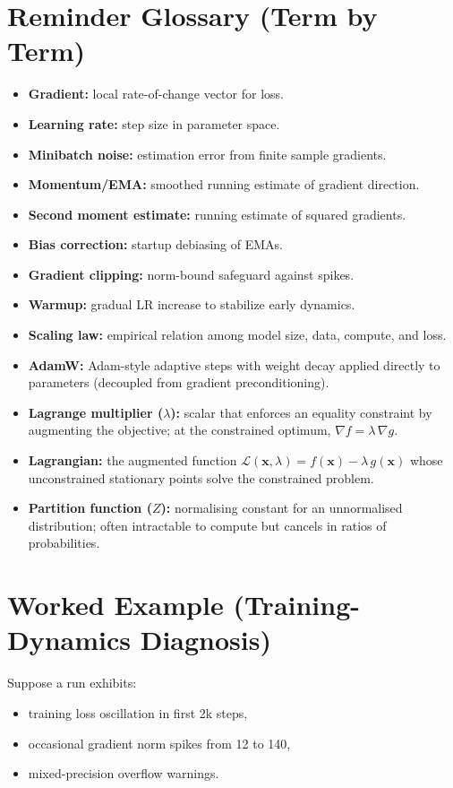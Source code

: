 \section*{Reminder Glossary (Term by Term)}
\begin{itemize}[leftmargin=1.5em]
  \item \textbf{Gradient:} local rate-of-change vector for loss.
  \item \textbf{Learning rate:} step size in parameter space.
  \item \textbf{Minibatch noise:} estimation error from finite sample gradients.
  \item \textbf{Momentum/EMA:} smoothed running estimate of gradient direction.
  \item \textbf{Second moment estimate:} running estimate of squared gradients.
  \item \textbf{Bias correction:} startup debiasing of EMAs.
  \item \textbf{Gradient clipping:} norm-bound safeguard against spikes.
  \item \textbf{Warmup:} gradual LR increase to stabilize early dynamics.
  \item \textbf{Scaling law:} empirical relation among model size, data, compute, and loss.
  \item \textbf{AdamW:} Adam-style adaptive steps with weight decay applied directly to parameters (decoupled from gradient preconditioning).
  \item \textbf{Lagrange multiplier ($\lambda$):} scalar that enforces an equality constraint by augmenting the objective; at the constrained optimum, $\nabla f = \lambda\,\nabla g$.
  \item \textbf{Lagrangian:} the augmented function $\mathcal{L}(\mathbf{x},\lambda) = f(\mathbf{x}) - \lambda\,g(\mathbf{x})$ whose unconstrained stationary points solve the constrained problem.
  \item \textbf{Partition function ($Z$):} normalising constant for an unnormalised distribution; often intractable to compute but cancels in ratios of probabilities.
\end{itemize}

\section*{Worked Example (Training-Dynamics Diagnosis)}
Suppose a run exhibits:
\begin{itemize}[leftmargin=1.5em]
  \item training loss oscillation in first 2k steps,
  \item occasional gradient norm spikes from 12 to 140,
  \item mixed-precision overflow warnings.
\end{itemize}

